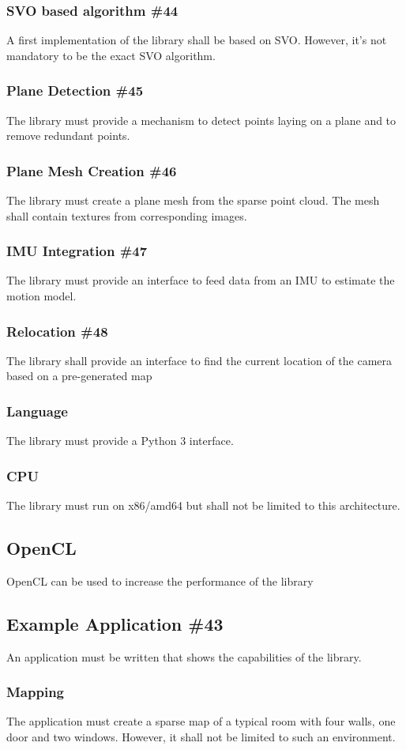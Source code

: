 \documentclass[11pt,a4paper,titlepage,oneside]{report}
\begin{document}
\subsubsection{SVO based algorithm \#44}
A first implementation of the library shall be based on SVO. However, it's not mandatory to be the exact SVO algorithm.
\subsubsection{Plane Detection \#45}
The library must provide a mechanism to detect points laying on a plane and to remove redundant points.
\subsubsection{Plane Mesh Creation \#46}
The library must create a plane mesh from the sparse point cloud. The mesh shall contain textures from corresponding images.
\subsubsection{IMU Integration \#47}
The library must provide an interface to feed data from an IMU to estimate the motion model.
\subsubsection{Relocation \#48}
The library shall provide an interface to find the current location of the camera based on a pre-generated map
\subsubsection{Language}
The library must provide a Python 3 interface.
\subsubsection{CPU}
The library must run on x86/amd64 but shall not be limited to this architecture.
\subsection{OpenCL}
OpenCL can be used to increase the performance of the library
\subsection{Example Application \#43}
An application must be written that shows the capabilities of the library. 
\subsubsection{Mapping}
The application must create a sparse map of a typical room with four walls, one door and two windows. However, it shall not be limited to such an environment.
\end{document}
